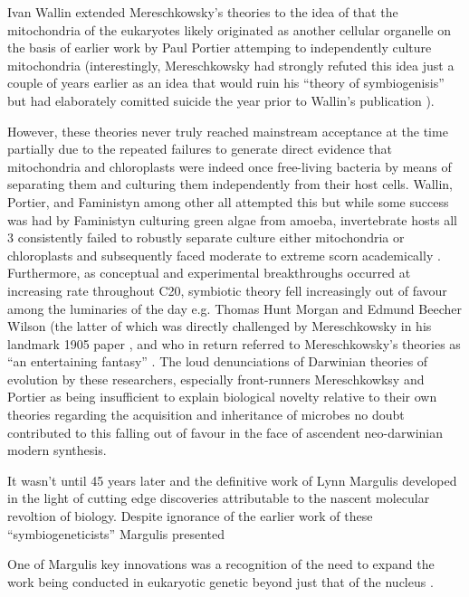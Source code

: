 Ivan Wallin extended Mereschkowsky's theories to the idea of that the mitochondria
of the eukaryotes likely originated as another cellular organelle \citep{Wallin1922} 
on the basis of earlier work by Paul Portier attemping to independently
culture mitochondria \citep{Sapp2002} (interestingly, 
Mereschkowsky had strongly refuted this idea just a couple of years earlier as 
an idea that would ruin his ``theory of symbiogenisis'' \citep{Sapp2002} but 
had elaborately comitted suicide the year prior to Wallin's publication \citep{Sapp2002}).

However, these theories never truly reached mainstream acceptance at the time
partially due to the repeated failures to generate direct evidence that mitochondria
and chloroplasts were indeed once free-living bacteria by means of separating them
and culturing them independently from their host cells.  Wallin, Portier, and Faministyn
among other all attempted this but while some success was had by Faministyn
culturing green algae from amoeba, invertebrate hosts all 3 consistently failed
to robustly separate culture either mitochondria or chloroplasts and subsequently
faced moderate to extreme scorn academically \citep{Archibald2014}.
Furthermore, as conceptual and experimental breakthroughs occurred at increasing
rate throughout C20, symbiotic theory fell increasingly out of favour among
the luminaries of the day e.g. Thomas Hunt Morgan and Edmund Beecher Wilson (the
latter of which was directly challenged by Mereschkowsky in his landmark 1905
paper \citep{Mereschkowsky1905,Martin1999a}, and who in return referred to Mereschkowsky's
theories as ``an entertaining fantasy'' \citep{Wilson1928,Martin1999a}
\citep{Archibald2014}. The loud denunciations of Darwinian theories of evolution
by these researchers, especially front-runners Mereschkowksy and Portier as being
insufficient to explain biological novelty relative to their own theories
regarding the acquisition and inheritance of microbes \citep{Sapp2002} no doubt
contributed to this falling out of favour in the face of ascendent neo-darwinian
modern synthesis.


It wasn't until 45 years later and the definitive work of Lynn Margulis \citep{Sagan1967} 
developed in the light of cutting edge discoveries attributable to the nascent
molecular revoltion of biology. Despite ignorance of the earlier work of these 
``symbiogeneticists'' \citep{Archibald2014} Margulis presented 


One of Margulis key innovations was a recognition of the need to expand the
work being conducted in eukaryotic genetic beyond just that of the nucleus
\citep{Archibald2012}.




